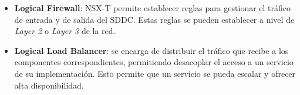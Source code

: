 \begin{itemize}
\begin{itemize}
\begin{itemize}
        \item \textbf{Logical Firewall}: NSX-T permite establecer reglas para gestionar el tráfico de entrada y de salida del SDDC. Estas reglas se pueden establecer a nivel de \textit{Layer 2} o \textit{Layer 3} de la red.
        \item \textbf{Logical Load Balancer}: se encarga de distribuir el tráfico que recibe a los componentes correspondientes, permitiendo desacoplar el acceso a un servicio de su implementación. Esto permite que un servicio se pueda escalar y ofrecer alta disponibilidad.
    \end{itemize}
        
\FloatBarrier
    \end{itemize}
    

\end{itemize}
